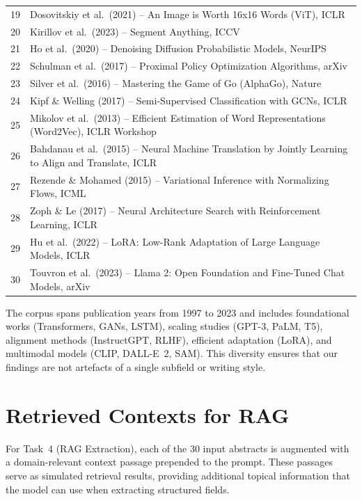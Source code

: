 \documentclass[11pt]{article}
\begin{document}
\begin{longtable}{@{}r p{}@{}}
19 & Dosovitskiy et al.\ (2021) -- An Image is Worth 16x16 Words (ViT), ICLR \\
20 & Kirillov et al.\ (2023) -- Segment Anything, ICCV \\
21 & Ho et al.\ (2020) -- Denoising Diffusion Probabilistic Models, NeurIPS \\
22 & Schulman et al.\ (2017) -- Proximal Policy Optimization Algorithms, arXiv \\
23 & Silver et al.\ (2016) -- Mastering the Game of Go (AlphaGo), Nature \\
24 & Kipf \& Welling (2017) -- Semi-Supervised Classification with GCNs, ICLR \\
25 & Mikolov et al.\ (2013) -- Efficient Estimation of Word Representations (Word2Vec), ICLR Workshop \\
26 & Bahdanau et al.\ (2015) -- Neural Machine Translation by Jointly Learning to Align and Translate, ICLR \\
27 & Rezende \& Mohamed (2015) -- Variational Inference with Normalizing Flows, ICML \\
28 & Zoph \& Le (2017) -- Neural Architecture Search with Reinforcement Learning, ICLR \\
29 & Hu et al.\ (2022) -- LoRA: Low-Rank Adaptation of Large Language Models, ICLR \\
30 & Touvron et al.\ (2023) -- Llama 2: Open Foundation and Fine-Tuned Chat Models, arXiv \\
\end{longtable}

\noindent The corpus spans publication years from 1997 to 2023 and includes foundational works (Transformers, GANs, LSTM), scaling studies (GPT-3, PaLM, T5), alignment methods (InstructGPT, RLHF), efficient adaptation (LoRA), and multimodal models (CLIP, DALL-E~2, SAM). This diversity ensures that our findings are not artefacts of a single subfield or writing style.


\section{Retrieved Contexts for RAG}
\label{sec:s3}

For Task~4 (RAG Extraction), each of the 30 input abstracts is augmented with a domain-relevant context passage prepended to the prompt. These passages serve as simulated retrieval results, providing additional topical information that the model can use when extracting structured fields.
\end{document}

